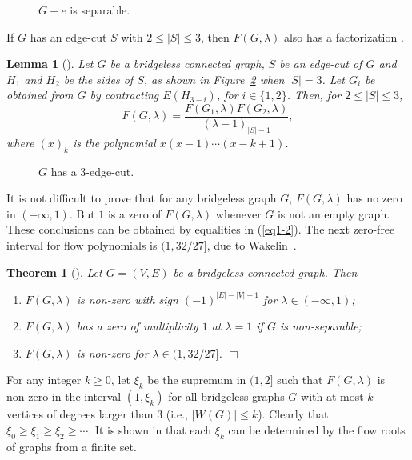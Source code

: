 \documentclass[11pt]{article}
\newtheorem{lem}{Lemma}
\newtheorem{theo}{Theorem}
\newcommand {\red} {\textcolor{red}}
\newcommand{\proofend}{{\hfill$\Box$}}
\newcommand{\beeq}{\begin{equation}}
\newcommand{\eneq}{\end{equation}}
\newcommand {\relabel}[1] {\label{#1} \red{[*: #1]}}\newcommand {\rebibitem}[1] {\bibitem{#1} \red{[*: #1]}}%
\def\relabel {\label} \def\rebibitem {\bibitem}  %
\begin{document}
\begin{figure}[h!]
\centering 
\scalebox{0.9}{}
\caption{\relabel{f1} $G-e$ is separable.}
\end{figure}


If $G$ has an edge-cut $S$ with $2\le |S|\le 3$,
then $F(G,\lambda)$ also has a factorization \cite{jac3}. 

\begin{lem}[\cite{jac3}]
\relabel{2-edge}
Let $G$ be a bridgeless connected graph, 
$S$ be an edge-cut of $G$ 
and $H_1$ and $H_2$ be the sides of $S$, as shown in 
Figure~\ref{f2} when $|S|=3$. 
Let $G_i$ be obtained from $G$ by contracting 
$E(H_{3-i})$, for $i\in \{1, 2\}$. Then, for $2\le |S|\le 3$,
\beeq
F(G, \lambda) =
\frac{F(G_1, \lambda)F(G_2, \lambda)}
{(\lambda -1)_{|S|-1}},
\eneq
where $(x)_k$ is the polynomial $x(x-1)\cdots (x-k+1)$. 
\end{lem}


\begin{figure}[h!]
\centering 
\scalebox{0.9}{}
\caption{\relabel{f2} $G$ has a $3$-edge-cut.}
\end{figure}

It is not difficult to prove that for any 
bridgeless graph $G$, $F(G,\lambda)$ has no zero 
in $(-\infty, 1)$. 
But $1$ is a zero of $F(G,\lambda)$ whenever 
$G$ is not an empty graph. 
These conclusions can be obtained by equalities in (\ref{eq1-2}).
The next zero-free interval for flow polynomials
is $(1,32/27]$, due to Wakelin~\cite{wak}.


\begin{theo}[\cite{wak}]
\relabel{Wakelin}
Let $G=(V,E)$ be a bridgeless connected graph. Then
\begin{enumerate}
\item
$F(G, \lambda)$ is non-zero with sign 
$(-1)^{|E|-|V|+1}$ for $\lambda\in (-\infty, 1)$;
\item 
$F(G, \lambda)$ has a zero of multiplicity 
$1$ at $\lambda=1$ if $G$ is non-separable;
\item 
$F(G, \lambda)$ is non-zero for $\lambda\in (1, 32/27]$.
\proofend
\end{enumerate}
\end{theo}

For any integer $k\ge 0$, 
let $\xi_k$ be the supremum in $(1,2]$ 
such that $F(G,\lambda)$ is non-zero in the interval 
$(1,\xi_k)$ for all bridgeless graphs $G$ 
with at most $k$ vertices of degrees larger than 
$3$ (i.e., $|W(G)|\le k$). 
Clearly that $\xi_0\ge \xi_1\ge \xi_2\ge \cdots$. 
It is shown in \cite{dong2} that 
each $\xi_k$ can be determined by 
the flow roots of graphs from a finite set.
\end{document}
